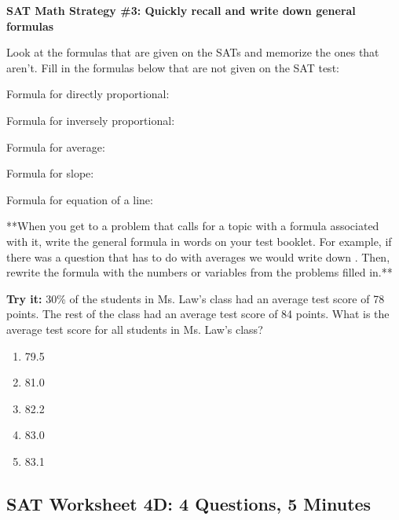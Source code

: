\documentclass[12pt]{book}
\newcommand{\longline}{\underline{\hspace{2in}} }
\begin{document}
\vfill
\pagebreak
\textbf{SAT Math Strategy \#3: Quickly recall and write down general formulas}

Look at the formulas that are given on the SATs and memorize the ones that aren't. Fill in the formulas below that are not given on the SAT test:

\bigskip
Formula for directly proportional:

\bigskip
Formula for inversely proportional:

\bigskip
Formula for average:

\bigskip
Formula for slope:

\bigskip
Formula for equation of a line:

\bigskip
**When you get to a problem that calls for a topic with a formula associated with it, write the general formula in words on your test booklet. For example, if there was a question that has to do with averages we would write down \longline. Then, rewrite the formula with the numbers or variables from the problems filled in.**

\vfill
\textbf{Try it:} 30\% of the students in Ms. Law's class had an average test score of 78 points. The rest of the class had an average test score of 84 points. What is the average test score for all students in Ms. Law's class?

\begin{enumerate}[label=(\Alph*)]
\item 79.5
\item 81.0
\item 82.2
\item 83.0
\item 83.1
\end{enumerate}

\vfill
\newpage
\subsection{SAT Worksheet 4D: 4 Questions, 5 Minutes}
\end{document}
